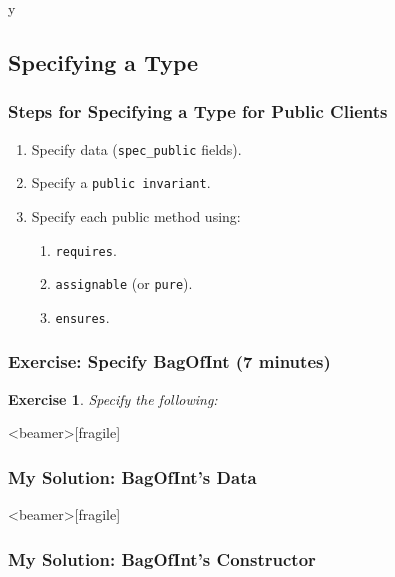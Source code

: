 \if y\MAKEHANDOUTS \documentclass[t,compress,landscape,handout]{beamer}
\newtheorem*{exercise}{Exercise}
\begin{document}
\subsection[Exercise]{Specifying a Type}

\begin{frame}[fragile]
\frametitle{Steps for Specifying a Type for Public Clients}

\begin{enumerate}
\item
Specify data (\lstinline!spec_public! fields).

\item
Specify a \lstinline!public invariant!.

\item
Specify each public method using:

\begin{enumerate}
\item
\lstinline!requires!.

\item
\lstinline!assignable! (or \lstinline!pure!).

\item
\lstinline!ensures!.
\end{enumerate}
\end{enumerate}
\end{frame}

\begin{frame}[fragile]
\frametitle{Exercise: Specify BagOfInt (7 minutes)}

\begin{exercise}
Specify the following:

\rm

\end{exercise}
\end{frame}

\begin{frame}<beamer>[fragile]
\frametitle{My Solution: BagOfInt's Data}


\end{frame}

\begin{frame}<beamer>[fragile]
\frametitle{My Solution: BagOfInt's Constructor}


\end{frame}
\end{document}
